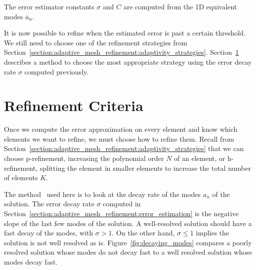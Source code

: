 \noindent
The error estimator constants $\sigma$ and $C$ are computed from the 1D equivalent modes
$\overline{a}_n$.

It is now possible to refine when the estimated error is past a certain threshold. We still need to
choose one of the refinement strategies from
Section~\ref{section:adaptive_mesh_refinement:adaptivity_strategies}.
Section~\ref{section:adaptive_mesh_refinement:refinement_criteria} describes a method to choose the
most appropriate strategy using the error decay rate $\sigma$ computed previously.

\section{Refinement Criteria} \label{section:adaptive_mesh_refinement:refinement_criteria}

Once we compute the error approximation on every element and know which elements we want to refine,
we must choose how to refine them. Recall from
Section~\ref{section:adaptive_mesh_refinement:adaptivity_strategies} that we can choose
p-refinement, increasing the polynomial order $N$ of an element, or h-refinement, splitting the
element in smaller elements to increase the total number of elements $K$.

The method~\cite{Mavriplis1990} used here is to look at the decay rate of the modes $a_n$ of the
solution. The error decay rate $\sigma$ computed in
Section~\ref{section:adaptive_mesh_refinement:error_estimation} is the negative slope of the last
few modes of the solution. A well-resolved solution should have a fast decay of the modes, with
$\sigma > 1$. On the other hand, $\sigma \leqslant 1$ implies the solution is not well resolved as
is. Figure~\ref{fig:decaying_modes} compares a poorly resolved solution whose modes do not decay
fast to a well resolved solution whose modes decay fast.

